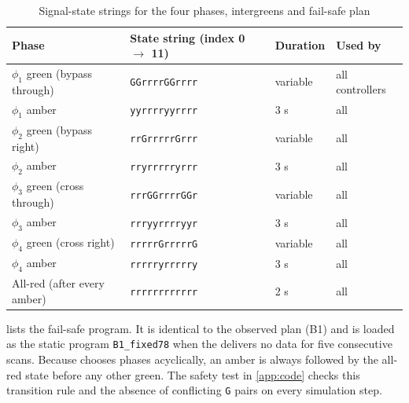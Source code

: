 \begin{table}[htbp]
\centering
\caption{Signal-state strings for the four phases, intergreens and fail-safe plan}\label{tab:app-states}
\small
\begin{tabular}{@{}llll@{}}
\toprule
Phase & State string (index 0 $\rightarrow$ 11) & Duration & Used by\\
\midrule
$\phi_1$ green (bypass through) & \texttt{GGrrrrGGrrrr} & variable & all controllers\\
$\phi_1$ amber & \texttt{yyrrrryyrrrr} & 3 s & all\\
$\phi_2$ green (bypass right) & \texttt{rrGrrrrrGrrr} & variable & all\\
$\phi_2$ amber & \texttt{rryrrrrryrrr} & 3 s & all\\
$\phi_3$ green (cross through) & \texttt{rrrGGrrrrGGr} & variable & all\\
$\phi_3$ amber & \texttt{rrryyrrrryyr} & 3 s & all\\
$\phi_4$ green (cross right) & \texttt{rrrrrGrrrrrG} & variable & all\\
$\phi_4$ amber & \texttt{rrrrryrrrrry} & 3 s & all\\
All-red (after every amber) & \texttt{rrrrrrrrrrrr} & 2 s & all\\
\bottomrule
\end{tabular}
\end{table}

 lists the fail-safe program. It is identical to the observed plan (B1) and is
loaded as the static program \texttt{B1\_fixed78} when the \vls{} delivers no data for five
consecutive scans. Because \prism{} chooses phases acyclically, an amber is always followed by the
all-red state before any other green. The safety test in \cref{app:code} checks this transition rule
and the absence of conflicting \texttt{G} pairs on every simulation step.

